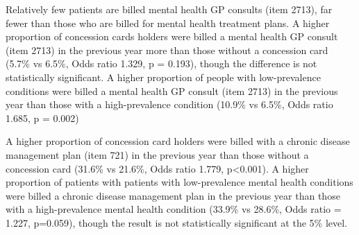 \documentclass[
  letterpaper,
  DIV=11,
  numbers=noendperiod,
  oneside]{scrartcl}
\begin{document}
Relatively few patients are billed mental health GP consults (item
2713), far fewer than those who are billed for mental health treatment
plans. A higher proportion of concession cards holders were billed a
mental health GP consult (item 2713) in the previous year more than
those without a concession card (5.7\% vs 6.5\%, Odds ratio 1.329, p =
0.193), though the difference is not statistically significant. A higher
proportion of people with low-prevalence conditions were billed a mental
health GP consult (item 2713) in the previous year than those with a
high-prevalence condition (10.9\% vs 6.5\%, Odds ratio 1.685, p = 0.002)

A higher proportion of concession card holders were billed with a
chronic disease management plan (item 721) in the previous year than
those without a concession card (31.6\% vs 21.6\%, Odds ratio 1.779,
p\textless0.001). A higher proportion of patients with patients with
low-prevalence mental health conditions were billed a chronic disease
management plan in the previous year than those with a high-prevalence
mental health condition (33.9\% vs 28.6\%, Odds ratio = 1.227, p=0.059),
though the result is not statistically significant at the 5\% level.
\end{document}

